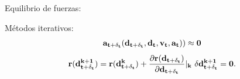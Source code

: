 \documentclass[
  aspectratio=169,
]{beamer}
\begin{document}
\begin{small}
\begin{frame}{Equilibrio de fuerzas:}{}
\begin{block}{Métodos iterativos:}
\begin{equation}
\begin{split}
			\bf{a}_{t+\delta_t}(d_{t+\delta_t},\bf{d_t},\bf{v_t},\bf{a_t}))
			\approx 0
		\end{split}
		\end{equation}
		\begin{equation}\label{Eq:MET:Residuo}
		\bf{r}(\bf{d}^{k+1}_{t+\delta_t})=\bf{r}(\bf{d}^k_{t+\delta_t}) +
		\frac{\partial  \bf{r}(\bf{d}_{t+\delta_t})}{\partial
			\bf{d}_{t+\delta_t}}|_k~\delta \bf{d}^{k+1}_{t+\delta_t}=0.
	\end{equation}
\end{block}
\end{frame}


\end{small}
\end{document}
